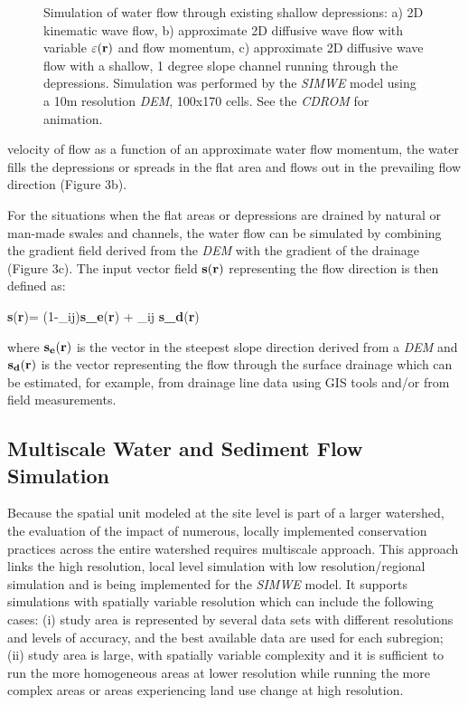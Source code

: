 \documentclass{kapedbk} %
\begin{document}
\begin{figure}[h]
\centerline{}
\caption{Simulation of water flow through existing shallow depressions:
a) 2D kinematic wave flow, b) approximate 2D diffusive wave flow
with variable $\varepsilon({\bf r})$ and flow momentum,
c) approximate 2D diffusive wave flow with a shallow, 1 degree slope
channel running through the depressions. Simulation was performed
by the {\sl SIMWE} model using a 10m resolution {\sl DEM}, 100x170 cells.
See the {\sl CDROM} for animation.}
\end{figure}

\noindent
velocity of flow as a function of an approximate water flow momentum,
the  water fills the depressions or spreads in the flat area
and flows out in the prevailing flow direction (Figure 3b).

For the situations when the flat areas or depressions are drained by natural
or man-made swales and channels, the water flow
can be simulated by combining the gradient field derived from the {\sl DEM} with
 the gradient of the drainage (Figure 3c). The input vector field
${\bf s(r)}$ representing
the flow direction is then defined as:

\leftequation 
{\bf s}({\bf r})=
(1-\delta_{ij}){\bf s_e}({\bf r}) + \delta_{ij} {\bf s_d}({\bf r})
\endleftequation

\noindent
where ${\bf s_e(r)}$ is the vector in the steepest slope direction derived
from a {\sl DEM} and ${\bf s_d(r)}$ is the vector representing the
flow through the surface drainage which can be estimated, for example, 
from drainage line data using GIS tools and/or from field measurements.

\bigskip \medskip \noindent
\subsection{Multiscale Water and Sediment Flow Simulation}

\medskip
Because the spatial unit modeled at the site
level is part of a larger watershed, the evaluation of the impact of
numerous, locally implemented conservation practices across the entire watershed
requires multiscale approach. This approach links the high resolution, local level
simulation with low resolution/regional simulation and is being implemented
for the {\sl SIMWE} model. It supports simulations with spatially
variable resolution which can include the following cases:
(i) study area is represented by several data sets with
different resolutions and levels of accuracy, and
the best available data are used for each subregion;
(ii) study area is large, with spatially variable complexity
and it is sufficient to run the more homogeneous areas at lower resolution
while running the more complex areas or areas experiencing land use
change at high resolution.
\end{document}
